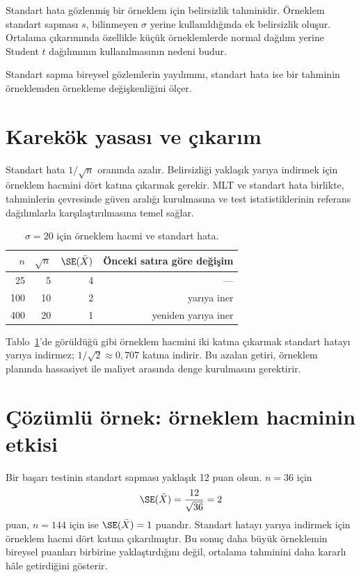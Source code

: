 Standart hata gözlenmiş bir örneklem için belirsizlik tahminidir. Örneklem
standart sapması $s$, bilinmeyen $\sigma$ yerine kullanıldığında ek belirsizlik
oluşur. Ortalama çıkarımında özellikle küçük örneklemlerde normal dağılım
yerine Student $t$ dağılımının kullanılmasının nedeni budur.

\begin{mistakebox}
Standart sapma bireysel gözlemlerin yayılımını, standart hata ise bir
tahminin örneklemden örnekleme değişkenliğini ölçer.
\end{mistakebox}

\section{Karekök yasası ve çıkarım}

Standart hata $1/\sqrt n$ oranında azalır. Belirsizliği yaklaşık yarıya
indirmek için örneklem hacmini dört katına çıkarmak gerekir. MLT ve standart
hata birlikte, tahminlerin çevresinde güven aralığı kurulmasına ve test
istatistiklerinin referans dağılımlarla karşılaştırılmasına temel sağlar.

\begin{table}[H]
\centering
\caption{$\sigma=20$ için örneklem hacmi ve standart hata.}
\label{tab:se-by-n}
\begin{tabular}{rrrr}
\toprule
$n$ & $\sqrt n$ & $\SE(\bar X)$ & Önceki satıra göre değişim \\
\midrule
25  & 5  & 4 & --- \\
100 & 10 & 2 & yarıya iner \\
400 & 20 & 1 & yeniden yarıya iner \\
\bottomrule
\end{tabular}
\end{table}

Tablo~\ref{tab:se-by-n}'de görüldüğü gibi örneklem hacmini iki katına çıkarmak
standart hatayı yarıya indirmez;
$1/\sqrt2\approx0{,}707$ katına indirir. Bu azalan getiri, örneklem planında
hassasiyet ile maliyet arasında denge kurulmasını gerektirir.

\section{Çözümlü örnek: örneklem hacminin etkisi}

Bir başarı testinin standart sapması yaklaşık 12 puan olsun. $n=36$ için
\[
\SE(\bar X)=\frac{12}{\sqrt{36}}=2
\]
puan, $n=144$ için ise $\SE(\bar X)=1$ puandır. Standart hatayı yarıya
indirmek için örneklem hacmi dört katına çıkarılmıştır. Bu sonuç daha büyük
örneklemin bireysel puanları birbirine yaklaştırdığını değil, ortalama
tahminini daha kararlı hâle getirdiğini gösterir.

